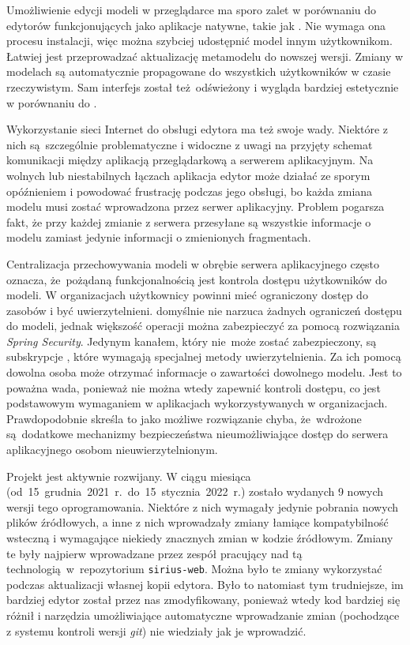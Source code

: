 Umożliwienie edycji modeli w przeglądarce ma sporo zalet w porównaniu do
edytorów funkcjonujących jako aplikacje natywne, takie jak \SiriusDesktop{}.
Nie wymaga ona procesu instalacji, więc można szybciej
udostępnić
model innym użytkownikom. Łatwiej jest przeprowadzać aktualizację metamodelu do
nowszej wersji. Zmiany w modelach są automatycznie propagowane do wszystkich
użytkowników w czasie rzeczywistym. Sam interfejs został też~odświeżony i
wygląda bardziej estetycznie w porównaniu do \SiriusDesktop{}.

Wykorzystanie sieci Internet do obsługi edytora ma też swoje wady. Niektóre z
nich są~szczególnie problematyczne i widoczne z uwagi na przyjęty schemat
komunikacji między aplikacją przeglądarkową a serwerem aplikacyjnym. Na wolnych
lub niestabilnych łączach aplikacja edytor może działać ze sporym opóźnieniem i
powodować frustrację podczas jego obsługi, bo każda zmiana modelu musi zostać
wprowadzona przez serwer aplikacyjny. Problem pogarsza fakt, że przy każdej
zmianie z serwera przesyłane są wszystkie informacje o modelu zamiast jedynie
informacji o zmienionych fragmentach.

Centralizacja przechowywania modeli w obrębie serwera aplikacyjnego często
oznacza, że~pożądaną funkcjonalnością jest kontrola dostępu użytkowników do
modeli. W organizacjach użytkownicy powinni mieć ograniczony dostęp do zasobów
i być uwierzytelnieni. \SiriusWeb{} domyślnie nie narzuca żadnych
ograniczeń dostępu do modeli, jednak większość operacji można zabezpieczyć za
pomocą rozwiązania \emph{Spring Security}. Jedynym kanałem, który nie~może
zostać
zabezpieczony, są subskrypcje \GraphQL{}, które wymagają specjalnej metody
uwierzytelnienia. Za ich pomocą dowolna osoba może otrzymać informacje o
zawartości dowolnego modelu. Jest to poważna wada, ponieważ nie można wtedy
zapewnić kontroli dostępu, co jest podstawowym wymaganiem w aplikacjach
wykorzystywanych w organizacjach. Prawdopodobnie skreśla to \SiriusWeb{}
jako możliwe rozwiązanie chyba, że~wdrożone są~dodatkowe mechanizmy
bezpieczeństwa nieumożliwiające dostęp do serwera aplikacyjnego osobom
nieuwierzytelnionym.

Projekt \SiriusWeb{} jest aktywnie rozwijany. W ciągu miesiąca
(od~15~grudnia~2021~r.~do~15~stycznia~2022~r.) zostało wydanych 9 nowych
wersji tego
oprogramowania. Niektóre z nich wymagały jedynie pobrania nowych plików
źródłowych, a inne z nich wprowadzały zmiany łamiące kompatybilność wsteczną i
wymagające niekiedy znacznych zmian w kodzie źródłowym. Zmiany te były najpierw
wprowadzane przez zespół pracujący nad tą technologią w~repozytorium
\texttt{sirius-web}. Można było te zmiany wykorzystać podczas aktualizacji
własnej kopii edytora. Było to natomiast tym trudniejsze, im bardziej edytor
został przez nas zmodyfikowany, ponieważ wtedy kod bardziej się różnił i
narzędzia umożliwiające automatyczne wprowadzanie zmian (pochodzące z systemu
kontroli wersji \emph{git}) nie wiedziały jak je wprowadzić.

